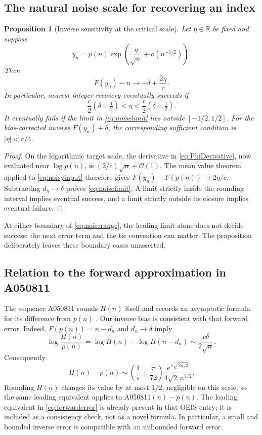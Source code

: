 \documentclass[11pt]{article}
\numberwithin{equation}{section}
\newtheorem{proposition}[theorem]{Proposition}
\theoremstyle{definition}
\theoremstyle{remark}
\newcommand{\OO}{\mathcal O}
\newcommand{\R}{\mathbb R}
\begin{document}
\subsection{The natural noise scale for recovering an index}
\begin{proposition}[Inverse sensitivity at the critical scale]\label{prop:noise}
Let $\eta\in\R$ be fixed and suppose
\begin{equation}\label{eq:noisyinput}
 y_n=p(n)\exp\!\left(\frac\eta{\sqrt n}+o(n^{-1/2})\right).
\end{equation}
Then
\begin{equation}\label{eq:noiselimit}
 F(y_n)-n\longrightarrow-\delta+\frac{2\eta}{c}.
\end{equation}
In particular, nearest-integer recovery eventually succeeds if
\begin{equation}\label{eq:noiserange}
 \frac c2(\delta-\tfrac12)<\eta<
 \frac c2(\delta+\tfrac12).
\end{equation}
It eventually fails if the limit in \eqref{eq:noiselimit} lies outside
$[-1/2,1/2]$. For the bias-corrected inverse $F(y_n)+\delta$, the
corresponding sufficient condition is $|\eta|<c/4$.
\end{proposition}
\begin{proof}
On the logarithmic target scale, the derivative in
\eqref{eq:PhiDerivative}, now evaluated near $\log p(n)$, is
$(2/c)\sqrt n+\OO(1)$. The mean value theorem applied to
\eqref{eq:noisyinput} therefore gives
$F(y_n)-F(p(n))\to2\eta/c$. Subtracting $d_n\to\delta$ proves
\eqref{eq:noiselimit}. A limit strictly inside the rounding interval
implies eventual success, and a limit strictly outside its closure
implies eventual failure.
\end{proof}

At either boundary of \eqref{eq:noiserange}, the leading limit alone
does not decide success; the next error term and the tie convention
can matter. The proposition deliberately leaves these boundary cases
unasserted.

\subsection{Relation to the forward approximation in A050811}
The sequence A050811 rounds $H(n)$ itself and records an asymptotic
formula for its difference from $p(n)$ \cite{oeis050811}. Our inverse
bias is consistent with that forward error. Indeed,
$F(p(n))=n-d_n$ and $d_n\to\delta$ imply
\[
 \log\frac{H(n)}{p(n)}
 =\log H(n)-\log H(n-d_n)
 \sim\frac{c\delta}{2\sqrt n}.
\]
Consequently
\begin{equation}\label{eq:forwarderror}
 H(n)-p(n)\sim
 \left(\frac1\pi+\frac\pi{72}\right)
 \frac{e^{\pi\sqrt{2n/3}}}{4\sqrt2\,n^{3/2}}.
\end{equation}
Rounding $H(n)$ changes its value by at most $1/2$, negligible on this
scale, so the same leading equivalent applies to A050811$(n)-p(n)$.
The leading equivalent in \eqref{eq:forwarderror} is already present
in that OEIS entry; it is included as a consistency check, not as a
novel formula. In particular, a small and bounded inverse error is
compatible with an unbounded forward error.
\end{document}
